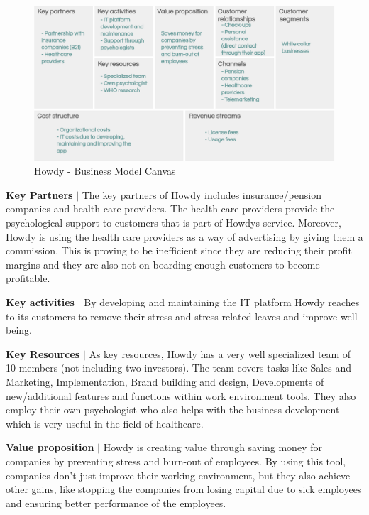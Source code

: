 \begin{figure}[H]
\centering
\includegraphics[width=14cm]{figures/BMC3.png}
\caption{Howdy - Business Model Canvas}
\label{fig:BCmodel}
\end{figure}

\noindent \textbf{Key Partners} $|$ The key partners of Howdy includes insurance/pension companies and health care providers. The health care providers provide the psychological support to customers that is part of Howdys service. Moreover, Howdy is using the health care providers as a way of advertising by giving them a commission. This is proving to be inefficient since they are reducing their profit margins and they are also not on-boarding enough customers to become profitable.

\noindent \textbf{Key activities} $|$ By developing and maintaining the IT platform Howdy reaches to its customers to remove their stress and stress related leaves and improve well-being.

\noindent \textbf{Key Resources} $|$ As key resources, Howdy has a very well specialized team of 10 members (not including two investors). The team covers tasks like Sales and Marketing, Implementation, Brand building and design, Developments of new/additional features and functions within work environment tools. They also employ their own psychologist who also helps with the business development which is very useful in the field of healthcare.

\noindent \textbf{Value proposition} $|$ Howdy is creating value through saving money for companies by preventing stress and burn-out of employees. By using this tool, companies don't just improve their working environment, but they also achieve other gains, like stopping the companies from losing capital due to sick employees and ensuring better performance of the employees.

